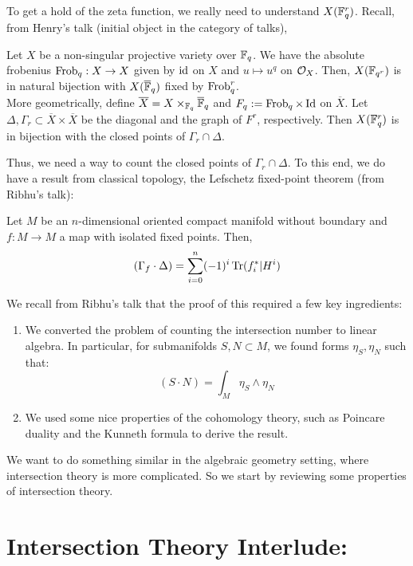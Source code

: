 \documentclass[12pt]{amsart}
\begin{document}
To get a hold of the zeta function, we really need to understand $X(\mathbb F_q^r)$. Recall, from Henry's talk (initial object in the category of talks),
\begin{theorem}
    Let $X$ be a non-singular projective variety over $\mathbb F_q$.  We have the absolute frobenius $\operatorname{Frob}_{q}: X \to X$ given by $\operatorname{id}$ on $X$ and $u \mapsto u^q$ on $\mathcal{O}_X$. Then, $X(\mathbb F_{q^r})$ is in natural bijection with $X(\overline{\mathbb F}_q)$ fixed by $\operatorname{Frob}_q^r$. \\
    More geometrically, define $\overline{X} = X \times_{\mathbb F_q} \overline{\mathbb F}_q$ and $F_q := \operatorname{Frob}_q \times \operatorname{Id}$ on $\overline{X}$. Let $\Delta, \Gamma_r \subset \overline{X} \times \overline{X}$ be the diagonal and the graph of $F^r$, respectively. Then $X(\mathbb F_q^r)$ is in bijection with the closed points of $\Gamma_r \cap \Delta$.
\end{theorem}

Thus, we need a way to count the closed points of $\Gamma_r \cap \Delta$. To this end, we do have a result from classical topology, the Lefschetz fixed-point theorem (from Ribhu's talk):
\begin{theorem}
    Let $M$ be an $n$-dimensional oriented compact manifold without boundary and $f: M \to M$ a map with isolated fixed points. Then, 
    \[  (\Gamma_f \cdot \Delta) = \sum_{i = 0}^n (-1)^i \operatorname{Tr}(f_i^*|H^i) \]
\end{theorem}

We recall from Ribhu's talk that the proof of this required a few key ingredients: 
\begin{enumerate}
    \item We converted the problem of counting the intersection number to linear algebra. In particular, for submanifolds $S, N \subset M$, we found forms $\eta_S, \eta_N$ such that:
    \[ (S \cdot N) = \int_M \eta_S \wedge \eta_N \]
    \item We used some nice properties of the cohomology theory, such as Poincare duality and the Kunneth formula to derive the result. 
\end{enumerate}

We want to do something similar in the algebraic geometry setting, where intersection theory is more complicated. So we start by reviewing some properties of intersection theory. 


\newpage 

\section{Intersection Theory Interlude:}
\end{document}
